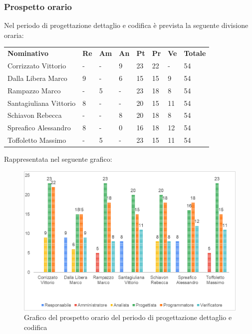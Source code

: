 \subsubsection{Prospetto orario}
Nel periodo di progettazione dettaglio e codifica è prevista la seguente divisione oraria:
\begin{longtable} {				
		>{}p{40mm}  
		>{}p{8mm}
		>{}p{8mm}
		>{}p{8mm}
		>{}p{8mm}
		>{}p{8mm}
		>{}p{8mm}
		>{}p{12mm}				
	}			
	\rowcolor{gray!50}
	\textbf{Nominativo} & \textbf{Re} & \textbf{Am} & \textbf{An} & \textbf{Pt} & \textbf{Pr} & \textbf{Ve} & \textbf{Totale}	\TBstrut \\ [2mm]
	Corrizzato Vittorio & - & - & 9 & 23 & 22 & - & 54 \TBstrut \\ [2mm]
	Dalla Libera Marco & 9 & - & 6 & 15 & 15 & 9 & 54 \TBstrut \\ [2mm]
	Rampazzo Marco & - & 5 & - & 23 & 18 & 8 & 54 \TBstrut \\ [2mm]
	Santagiuliana Vittorio & 8 & - & - & 20 & 15 & 11 & 54 \TBstrut \\ [2mm]
	Schiavon Rebecca & - & - & 8 & 20 & 18 & 8 & 54 \TBstrut \\ [2mm]
	Spreafico Alessandro & 8 & - & 0 & 16 & 18 & 12 & 54 \TBstrut \\ [2mm]
	Toffoletto Massimo & - & 5 & - & 23 & 15 & 11 & 54 \TBstrut \\ [2mm]
\end{longtable}
Rappresentata nel seguente grafico: \\
\begin{figure} [h!]
	\includegraphics[width=\linewidth]{./img/Grafici/5.png}
	\caption{Grafico del prospetto orario del periodo di progettazione dettaglio e codifica}
\end{figure}
